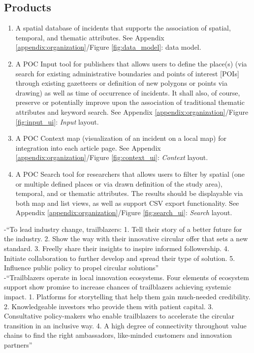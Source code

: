 \subsection{Products}
\begin{enumerate}
	\item A spatial database of incidents that supports the association of spatial, temporal, and thematic attributes. See Appendix \ref{appendix:organization}/Figure \ref{fig:data_model}: data model.
	\item A POC Input tool for publishers that allows users to define the place(s) (via search for existing administrative boundaries and points of interest [POIs] through existing gazetteers or definition of new polygons or points via drawing) as well as time of occurrence of incidents. It shall also, of course, preserve or potentially improve upon the association of traditional thematic attributes and keyword search. See Appendix \ref{appendix:organization}/Figure \ref{fig:input_ui}: \textit{Input} layout.
	\item A POC Context map (visualization of an incident on a local map) for integration into each article page. See Appendix \ref{appendix:organization}/Figure \ref{fig:context_ui}: \textit{Context} layout.
	\item A POC Search tool for researchers that allows users to filter by spatial (one or multiple defined places or via drawn definition of the study area), temporal, and or thematic attributes. The results should be displayable via both map and list views, as well as support CSV export functionality. See Appendix \ref{appendix:organization}/Figure \ref{fig:search_ui}: \textit{Search} layout.
\end{enumerate}
-{\color{orange}“To lead industry change, trailblazers: 1. Tell their story of a better future for the industry. 2. Show the way with their innovative circular offer that sets a new standard. 3. Freelly share their insights to inspire informed followership. 4. Initiate collaboration to further develop and spread their type of solution. 5. Influence public policy to propel circular solutions”\cite{WEF2021}}\\
-{\color{orange}“Trailblazers operate in local innovation ecosystems. Four elements of ecosystem support show promise to increase chances of trailblazers achieving systemic impact. 1. Platforms for storytelling that help them gain much-needed credibility. 2. Knowledgeable investors who provide them with patient capital. 3. Consultative policy-makers who enable trailblazers to accelerate the circular transition in an inclusive way. 4. A high degree of connectivity throughout value chains to find the right ambassadors, like-minded customers and innovation partners”\cite{WEF2021}}\\


